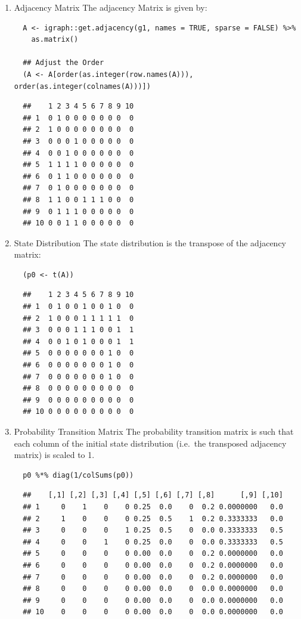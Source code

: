 \documentclass[11pt]{article}
\begin{document}
\begin{enumerate}
\item Adjacency Matrix
\label{sec:org39edb0e}
The adjacency Matrix is given by:

\begin{verbatim}
  A <- igraph::get.adjacency(g1, names = TRUE, sparse = FALSE) %>%
    as.matrix()

  ## Adjust the Order
  (A <- A[order(as.integer(row.names(A))), order(as.integer(colnames(A)))])
\end{verbatim}

\begin{verbatim}
  ##    1 2 3 4 5 6 7 8 9 10
  ## 1  0 1 0 0 0 0 0 0 0  0
  ## 2  1 0 0 0 0 0 0 0 0  0
  ## 3  0 0 0 1 0 0 0 0 0  0
  ## 4  0 0 1 0 0 0 0 0 0  0
  ## 5  1 1 1 1 0 0 0 0 0  0
  ## 6  0 1 1 0 0 0 0 0 0  0
  ## 7  0 1 0 0 0 0 0 0 0  0
  ## 8  1 1 0 0 1 1 1 0 0  0
  ## 9  0 1 1 1 0 0 0 0 0  0
  ## 10 0 0 1 1 0 0 0 0 0  0
\end{verbatim}

\item State Distribution
\label{sec:org66db707}
The state distribution is the transpose of the adjacency matrix:

\begin{verbatim}
  (p0 <- t(A))
\end{verbatim}

\begin{verbatim}
  ##    1 2 3 4 5 6 7 8 9 10
  ## 1  0 1 0 0 1 0 0 1 0  0
  ## 2  1 0 0 0 1 1 1 1 1  0
  ## 3  0 0 0 1 1 1 0 0 1  1
  ## 4  0 0 1 0 1 0 0 0 1  1
  ## 5  0 0 0 0 0 0 0 1 0  0
  ## 6  0 0 0 0 0 0 0 1 0  0
  ## 7  0 0 0 0 0 0 0 1 0  0
  ## 8  0 0 0 0 0 0 0 0 0  0
  ## 9  0 0 0 0 0 0 0 0 0  0
  ## 10 0 0 0 0 0 0 0 0 0  0
\end{verbatim}

\item Probability Transition Matrix
\label{sec:org035b5f7}
The probability transition matrix is such that each column of the
initial state distribution (i.e. the transposed adjacency matrix) is
scaled to 1.

\begin{verbatim}
  p0 %*% diag(1/colSums(p0))
\end{verbatim}

\begin{verbatim}
  ##    [,1] [,2] [,3] [,4] [,5] [,6] [,7] [,8]      [,9] [,10]
  ## 1     0    1    0    0 0.25  0.0    0  0.2 0.0000000   0.0
  ## 2     1    0    0    0 0.25  0.5    1  0.2 0.3333333   0.0
  ## 3     0    0    0    1 0.25  0.5    0  0.0 0.3333333   0.5
  ## 4     0    0    1    0 0.25  0.0    0  0.0 0.3333333   0.5
  ## 5     0    0    0    0 0.00  0.0    0  0.2 0.0000000   0.0
  ## 6     0    0    0    0 0.00  0.0    0  0.2 0.0000000   0.0
  ## 7     0    0    0    0 0.00  0.0    0  0.2 0.0000000   0.0
  ## 8     0    0    0    0 0.00  0.0    0  0.0 0.0000000   0.0
  ## 9     0    0    0    0 0.00  0.0    0  0.0 0.0000000   0.0
  ## 10    0    0    0    0 0.00  0.0    0  0.0 0.0000000   0.0
\end{verbatim}


\end{enumerate}
\end{document}
